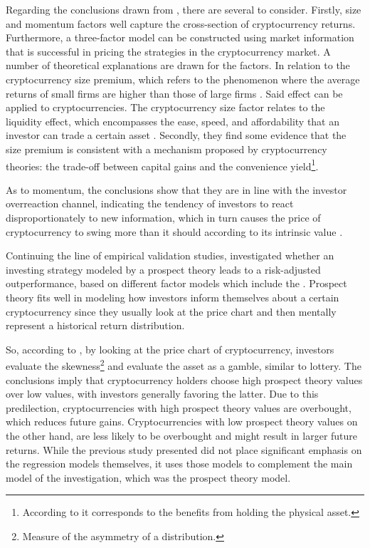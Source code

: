Regarding the conclusions drawn from \parencite{liu2022common}, there are several to consider. Firstly, size and momentum factors well capture the cross-section of cryptocurrency returns. Furthermore, a three-factor model can be constructed using market information that is successful in pricing the strategies in the cryptocurrency market. A number of theoretical explanations are drawn for the factors. In relation to the cryptocurrency size premium, which refers to the phenomenon where the average returns of small firms are higher than those of large firms \parencite{song2023size}. Said effect can be applied to cryptocurrencies. The cryptocurrency size factor relates to the liquidity effect, which encompasses the ease, speed, and affordability that an investor can trade a certain asset \parencite{hasan2022liquidity}. Secondly, they find some evidence that the size premium is consistent with a mechanism proposed by cryptocurrency theories: the trade-off between capital gains and the convenience yield\footnote{According to \parencite{Hull_deriv} it corresponds to the benefits from holding the physical asset.}.

As to momentum, the conclusions show that they are in line with the investor overreaction channel, indicating the tendency of investors to react disproportionately to new information, which in turn causes the price of cryptocurrency to swing more than it should according to its intrinsic value \parencite{10.1371/journal.pone.0264522}.

Continuing the line of empirical validation studies, \parencite{thoma2020prospect} investigated whether an investing strategy modeled by a prospect theory leads to a risk-adjusted outperformance, based on different factor models which include the \parencite{fama1993}. Prospect theory fits well in modeling how investors inform themselves about a certain cryptocurrency since they usually look at the price chart and then mentally represent a historical return distribution. 

So, according to \parencite{thoma2020prospect}, by looking at the price chart of cryptocurrency, investors evaluate the skewness\footnote{Measure of the asymmetry of a distribution.} and evaluate the asset as a gamble, similar to lottery. The conclusions imply that cryptocurrency holders choose high prospect theory values over low values, with investors generally favoring the latter. Due to this predilection, cryptocurrencies with high prospect theory values are overbought, which reduces future gains. Cryptocurrencies with low prospect theory values on the other hand, are less likely to be overbought and might result in larger future returns. While the previous study presented did not place significant emphasis on the regression models themselves, it uses those models to complement the main model of the investigation, which was the prospect theory model.

